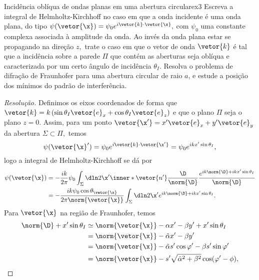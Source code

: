 \begin{exercício}{Incidência oblíqua de ondas planas em uma abertura circular}{ex3}
    Escreva a integral de Helmholtz-Kirchhoff no caso em que a onda incidente é uma onda plana, do tipo \(\psi(\vetor{\x}) = \psi_0 e^{i \vetor{k} \cdot \vetor{\x}},\) com \(\psi_0\) uma constante complexa associada à amplitude da onda. Ao invés da onda plana estar se propagando na direção \(z,\) trate o caso em que o vetor de onda \(\vetor{k}\) é tal que a incidência sobre a parede \(\Pi\) que contém as aberturas seja oblíqua e caracterizada por um certo ângulo de incidência \(\theta_I\). Resolva o problema de difração de Fraunhofer para uma abertura circular de raio \(a\), e estude a posição dos mínimos do padrão de interferência.
\end{exercício}
\begin{proof}[Resolução]
    Definimos os eixos coordenados de forma que \(\vetor{k} = k\left(\sin\theta_I \vetor{e}_x + \cos\theta_I \vetor{e}_z\right)\) e que o plano \(\Pi\) seja o plano \(z = 0.\) Assim, para um ponto \(\vetor{\x'} = x'\vetor{e}_x + y'\vetor{e}_y\) da abertura \(\Sigma \subset \Pi,\) temos
    \begin{equation*}
        \psi(\vetor{\x}') = \psi_0 e^{i \vetor{k} \cdot \vetor{\x'}} = \psi_0 e^{i k x'\sin\theta_I},
    \end{equation*}
    logo a integral de Helmholtz-Kirchhoff se  dá por
    \begin{align*}
        \psi(\vetor{\x}) &= -\frac{ik}{2\pi} \psi_0 \int_{\Sigma} \dln2{\x'} \inner*{\vetor{n'}}{\frac{\D}{\norm{\D}}} \frac{e^{ik\norm{\D} + ik x' \sin\theta_I}}{\norm{\D}}\\
                         &= -\frac{ik \psi_0 \cos\theta_{\vetor{\x}}}{2\pi \norm{\vetor{\x}}} \int_{\Sigma} \dln2{\x'} e^{ik\norm{\D} + ik x' \sin\theta_I}.
    \end{align*}
    Para \(\vetor{\x}\) na região de Fraunhofer, temos
    \begin{align*}
        \norm{\D} + x' \sin \theta_I &\simeq \norm{\vetor{\x}} - \alpha x' - \beta y' + x' \sin\theta_I\\
                                     &= \norm{\vetor{\x}} - \tilde{\alpha} x' - \beta y'\\
                                     &= \norm{\vetor{\x}} - \tilde{\alpha} s' \cos\varphi' - \beta s' \sin\varphi'\\
                                     &= \norm{\vetor{\x}} - s' \sqrt{\tilde{\alpha}^2 + \beta^2} \cos(\varphi' - \phi),

\end{align*}
\end{proof}
